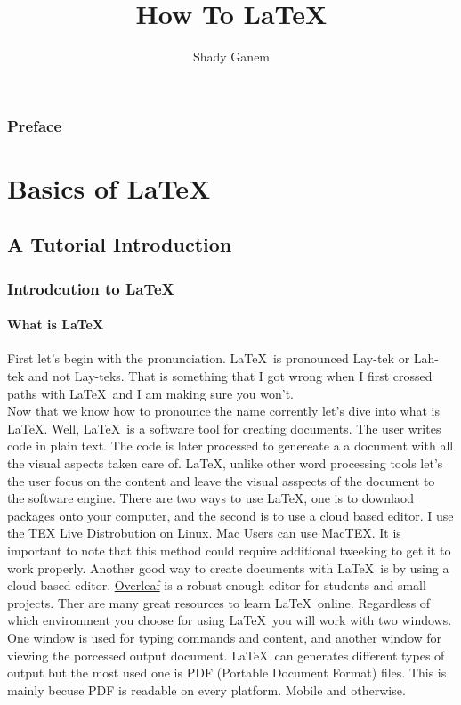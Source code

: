 \documentclass[12pt]{book}
\title{How To \LaTeX}
\author{Shady Ganem}
\begin{document}
\maketitle
\section*{Preface}
\tableofcontents
\newpage
{}%
\part{Basics of \LaTeX}

\chapter{A Tutorial Introduction}
\section{Introdcution to \LaTeX \ }
\subsection{What is \LaTeX \ }
First let's begin with the pronunciation. \LaTeX \ is pronounced Lay-tek or Lah-tek and not Lay-teks. 
That is something that I got wrong when I first crossed paths with \LaTeX \ and I am making sure you won't.\\
Now that we know how to pronounce the name corrently let's dive into what is \LaTeX. Well, \LaTeX \ is a software tool 
for creating documents. The user writes code in plain text. The code is later processed to genereate a 
a document with all the visual aspects taken care of. \LaTeX, unlike other word processing tools let's the user focus on the content and leave the visual asspects of the document to the software engine. 
\newline 
There are two ways to use \LaTeX, one is to downlaod packages onto your computer, and the second is to use a cloud based editor.
I use the \href{https://tug.org/texlive/}{TEX Live} Distrobution on Linux. Mac Users can use
\href{https://www.tug.org/mactex/}{MacTEX}. It is important to note that this method could require additional tweeking to get it to work properly.
\newline
Another good way to create documents with \LaTeX \ is by using a cloud based editor. 
\href{https://www.overleaf.com}{Overleaf} is a robust enough editor for students and small projects.
Ther are many great resources to learn \LaTeX \ online. 
\newline 
Regardless of which environment you choose for using \LaTeX \ you will work with two windows. 
One window is used for typing commands and content, and another window for viewing the porcessed output document.
\LaTeX \ can generates different types of output but the most used one is PDF (Portable Document Format) files. 
This is mainly becuse PDF is readable on every platform. Mobile and otherwise.\\
\end{document}
